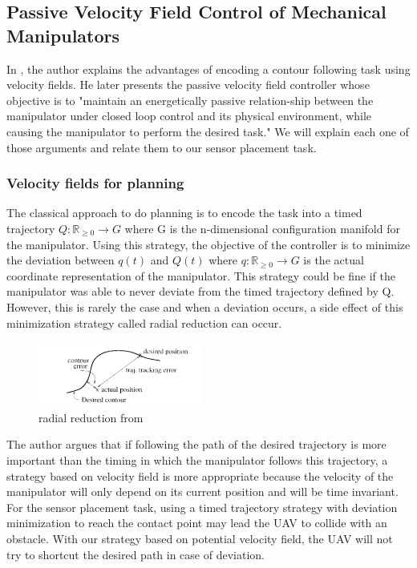 \subsection{Passive Velocity Field Control of Mechanical Manipulators}
In \cite{li1999passive}, the author explains the advantages of encoding a contour following task using velocity fields. 
He later presents the passive velocity field controller whose objective is to "maintain an energetically passive relation-ship between the manipulator under closed loop control and
its physical environment, while causing the manipulator to perform the desired task." 
We will explain each one of those arguments and relate them to our sensor placement task.
\subsubsection{Velocity fields for planning}
The classical approach to do planning is to encode the task into a timed trajectory $Q:\mathbb R_{\ge 0} \rightarrow G$ where G is the n-dimensional configuration manifold for the manipulator.
Using this strategy, the objective of the controller is to minimize the deviation between $q(t)$ and $Q(t)$ where $q:\mathbb R_{\ge 0} \rightarrow G$ is the actual coordinate representation of the manipulator.
This strategy could be fine if the manipulator was able to never deviate from the timed trajectory defined by Q. However, this is rarely the case and when a deviation occurs, a side effect of this minimization strategy called radial reduction can occur.
\begin{figure}[h!]
    \centering
    \includegraphics[width=0.48\textwidth]{Images/radialreduction.png}
    \caption{radial reduction from \cite{li1999passive}}
    \label{fig:radialreduction}
\end{figure} 
The author argues that if following the path of the desired trajectory is more important than the timing in which the manipulator follows this trajectory, a strategy based on velocity field is more appropriate because the velocity of the manipulator will only depend on its current position and will be time invariant.  
For the sensor placement task, using a timed trajectory strategy with deviation minimization to reach the contact point may lead the UAV to collide with an obstacle. With our strategy based on potential velocity field, the UAV will not try to shortcut the desired path in case of deviation.

